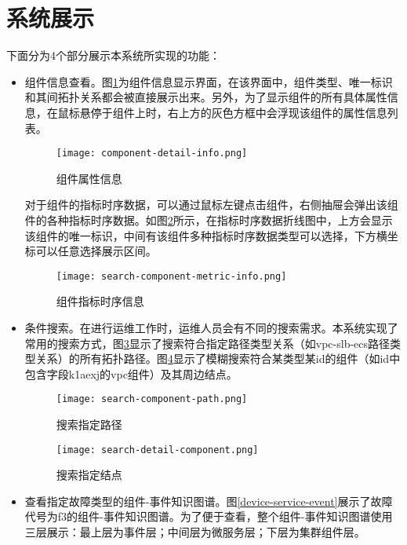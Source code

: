 \section{系统展示}
下面分为4个部分展示本系统所实现的功能：
\begin{itemize}
    \item [（1）]组件信息查看。图\ref{component-detail-info}为组件信息显示界面，在该界面中，组件类型、唯一标识和其间拓扑关系都会被直接展示出来。另外，为了显示组件的所有具体属性信息，在鼠标悬停于组件上时，右上方的灰色方框中会浮现该组件的属性信息列表。
    \begin{figure}[htbp]
        \centering
        \texttt{[image: component-detail-info.png]}
        \caption{组件属性信息\label{component-detail-info}}
    \end{figure}
    
    对于组件的指标时序数据，可以通过鼠标左键点击组件，右侧抽屉会弹出该组件的各种指标时序数据。如图\ref{search-component-metric-info}所示，在指标时序数据折线图中，上方会显示该组件的唯一标识，中间有该组件多种指标时序数据类型可以选择，下方横坐标可以任意选择展示区间。
\begin{figure}[htbp]
    \centering
    \texttt{[image: search-component-metric-info.png]}
    \caption{组件指标时序信息\label{search-component-metric-info}}
\end{figure}
    \item [（2）]条件搜索。在进行运维工作时，运维人员会有不同的搜索需求。本系统实现了常用的搜索方式，图\ref{search-component-path}显示了搜索符合指定路径类型关系（如vpc-slb-ecs路径类型关系）的所有拓扑路径。图\ref{search-detail-component}显示了模糊搜索符合某类型某id的组件（如id中包含字段k1aexj的vpc组件）及其周边结点。

    \begin{figure}[htbp]
        \centering
        \texttt{[image: search-component-path.png]}
        \caption{搜索指定路径\label{search-component-path}}
    \end{figure}
    \begin{figure}[htbp]
        \centering
        \texttt{[image: search-detail-component.png]}
        \caption{搜索指定结点\label{search-detail-component}}
    \end{figure}
    \newpage
    \item [（3）]查看指定故障类型的组件-事件知识图谱。图\ref{device-service-event}展示了故障代号为f3的组件-事件知识图谱。为了便于查看，整个组件-事件知识图谱使用三层展示：最上层为事件层；中间层为微服务层；下层为集群组件层。


\end{itemize}
